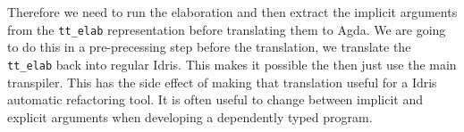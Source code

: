 \documentclass[parskip=half]{scrartcl}
\begin{document}
Therefore we need to run the elaboration and then extract the implicit
arguments from the \texttt{tt\_elab} representation before translating them to
Agda.  We are going to do this in a pre-precessing step before the translation,
we translate the \texttt{tt\_elab} back into regular Idris. This makes it
possible the then just use the main transpiler.  This has the side effect of
making that translation useful for a Idris automatic refactoring tool. It is
often useful to change between implicit and explicit arguments when developing
a dependently typed program.






\end{document}
